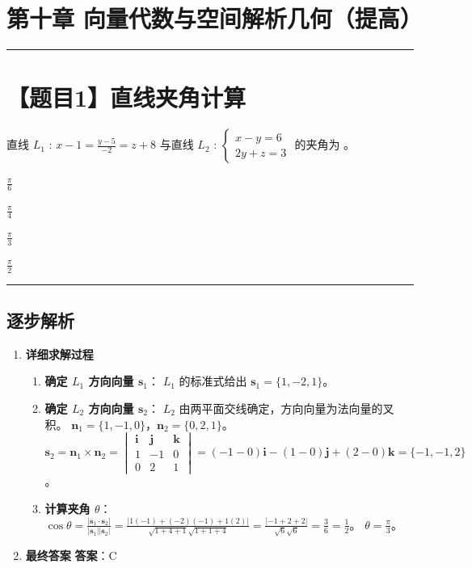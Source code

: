 \documentclass[UTF8]{ctexart}
\newenvironment{redenv}{\color{red}}{}
\newenvironment{detailedanalysis}{%
    \color{red}
    \begin{enumerate}[label=\textbf{第\arabic*步：}, leftmargin=*, align=left, itemsep=1.5ex]
}{%
    \end{enumerate}
}
\newcommand{\problemrule}{\noindent\rule{\textwidth}{1.5pt}\vspace{-0.8em}}
\newcommand{\analysisrule}{\noindent\rule{\textwidth}{0.8pt}\vspace{-0.8em}}
\newcommand{\choicesFour}[4]{
    \begin{enumerate}[label=\Alph*., itemsep=0pt, parsep=0pt, topsep=5pt, labelsep=0.5em]
        \begin{minipage}{0.22\linewidth} \item #1 \end{minipage}
        \begin{minipage}{0.22\linewidth} \item #2 \end{minipage}
        \begin{minipage}{0.22\linewidth} \item #3 \end{minipage}
        \begin{minipage}{0.22\linewidth} \item #4 \end{minipage}
    \end{enumerate}
}
\newcommand{\blank}[1]{\underline{\hspace{#1}}}
\begin{document}
\section*{第十章 向量代数与空间解析几何（提高）}

\problemrule
\section*{【题目1】直线夹角计算}
直线 $ L_{1} $ : $ x - 1 = \frac{y - 5}{-2} = z + 8 $ 与直线 $ L_{2} $ : $ \begin{cases} x - y = 6 \\ 2y + z = 3 \end{cases} $ 的夹角为 \blank{1cm}。
\choicesFour{$ \frac{\pi}{6} $}{$ \frac{\pi}{4} $}{$ \frac{\pi}{3} $}{$ \frac{\pi}{2} $}

\begin{redenv}
\analysisrule
\subsection*{逐步解析}

\begin{detailedanalysis}
\item \textbf{详细求解过程}
\begin{enumerate}[label=(\arabic*)]
\item \textbf{确定 $L_1$ 方向向量 $\mathbf{s}_1$}：
$L_1$ 的标准式给出 $\mathbf{s}_1 = \{1, -2, 1\}$。
\item \textbf{确定 $L_2$ 方向向量 $\mathbf{s}_2$}：
$L_2$ 由两平面交线确定，方向向量为法向量的叉积。
$\mathbf{n}_1 = \{1, -1, 0\}$，$\mathbf{n}_2 = \{0, 2, 1\}$。
$\mathbf{s}_2 = \mathbf{n}_1 \times \mathbf{n}_2 = \begin{vmatrix} \mathbf{i} & \mathbf{j} & \mathbf{k} \\ 1 & -1 & 0 \\ 0 & 2 & 1 \end{vmatrix} = (-1-0)\mathbf{i} - (1-0)\mathbf{j} + (2-0)\mathbf{k} = \{-1, -1, 2\}$。
\item \textbf{计算夹角 $\theta$}：
$\cos \theta = \frac{|\mathbf{s}_1 \cdot \mathbf{s}_2|}{|\mathbf{s}_1| |\mathbf{s}_2|} = \frac{|1(-1) + (-2)(-1) + 1(2)|}{\sqrt{1+4+1}\sqrt{1+1+4}} = \frac{|-1+2+2|}{\sqrt{6}\sqrt{6}} = \frac{3}{6} = \frac{1}{2}$。
$\theta = \frac{\pi}{3}$。
\end{enumerate}

\item \textbf{最终答案}
\textbf{答案}：C
\end{detailedanalysis}
\end{redenv}
\end{document}
